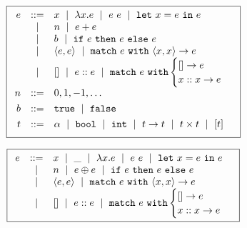 \begin{figure}
\small
\centering
  \begin{minipage}[c]{\linewidth}
  \[
  \boxed{
  \begin{array}{rcl}
  e & ::=    & x \ \mid\  \lambda x. e \ \mid\  e\ e \ \mid\  \mathtt{let}\ x = e\ \mathtt{in}\ e \\
    & \ \mid\  & n \ \mid\  e + e\\
    & \ \mid\  & b \ \mid\  \mathtt{if}\ e\ \mathtt{then}\ e\ \mathtt{else}\ e \\
    & \ \mid\  & \langle e, e \rangle \ \mid\  \mathtt{match}\ e\ \mathtt{with}\ \langle x, x \rangle \to e \\
    & \ \mid\  & \mathtt{[]} \ \mid\  e :: e \ \mid\  \mathtt{match}\ e\ \mathtt{with} \begin{cases} \mathtt{[]} \to e\\ x :: x \to e \end{cases} \\[0.05in]

  n & ::= &  0, 1, -1, \ldots \\[0.05in]

  b & ::= &  \mathtt{true} \ \mid\  \mathtt{false} \\[0.05in]

  t & ::= & \alpha \ \mid\  \mathtt{bool} \ \mid\  \mathtt{int} \ \mid\  t \to t \ \mid\  t \times t \ \mid\  [t] \\[0.05in]
  \end{array}
  }
  \]
  \label{fig:ml-syntax}
  \end{minipage}
  \begin{minipage}[c]{\linewidth}
    \[
    \boxed{
    \begin{array}{rcl}
    e & ::=    & x \ \mid\  \_  \ \mid\  \lambda x. e \ \mid\  e\ e \ \mid\  \mathtt{let}\ x = e\ \mathtt{in}\ e \\
      & \ \mid\  & n \ \mid\  e \oplus e \ \mid\  \mathtt{if}\ e\ \mathtt{then}\ e\ \mathtt{else}\ e \\
      & \ \mid\  & \langle e, e \rangle \ \mid\  \mathtt{match}\ e\ \mathtt{with}\ \langle x, x \rangle \to e \\
      & \ \mid\  & \mathtt{[]} \ \mid\  e :: e \ \mid\  \mathtt{match}\ e\ \mathtt{with} \begin{cases} \mathtt{[]} \to e\\ x :: x \to e \end{cases} \\[0.05in]
    \end{array}
    }
    \]
    \label{fig:rtl-syntax}
  \end{minipage}
\end{figure}
